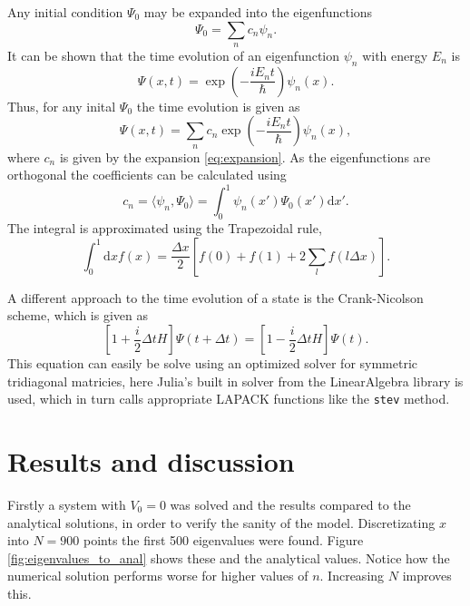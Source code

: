 \documentclass[a4paper, 11pt]{article}
\newcommand{\inner}[2]{\langle #1, #2 \rangle}
\begin{document}
Any initial condition $\Psi_0$ may be expanded into the eigenfunctions\cite{griffith}
\begin{equation}\label{eq:expansion}
\Psi_0 = \sum_n c_n \psi_n.
\end{equation}
It can be shown \cite{griffith} that the time evolution of an eigenfunction $\psi_n$ with energy $E_n$ is
\begin{equation}
\Psi(x, t) = \exp\left(-\frac{i E_n t}{\hbar} \right) \psi_n(x).
\end{equation}
Thus, for any inital $\Psi_0$ the time evolution is given as
\begin{equation}\label{eq:time_develop_expansion}
\Psi(x, t) = \sum_n c_n \exp\left(-\frac{i E_n t}{\hbar} \right) \psi_n(x),
\end{equation}
where $c_n$ is given by the expansion \eqref{eq:expansion}.
As the eigenfunctions are orthogonal\cite{griffith} the coefficients can be calculated using
\begin{equation}
c_n = \inner{\psi_n}{\Psi_0} = \int_0^1 \psi_n(x') \Psi_0(x') \mathrm{d}x'.
\end{equation}
The integral is approximated using the Trapezoidal rule,
\begin{equation}
\int_0^1 \mathrm{d}x f(x) = \frac{\Delta x}{2} \left[f(0) + f(1) + 2\sum_l f(l\Delta x)\right].
\end{equation}


A different approach to the time evolution of a state is the Crank-Nicolson scheme\cite{assignment}, which is given as
\begin{equation}\label{eq:crank_nicolson}
[1+\frac{i}{2} \Delta t H] \Psi(t + \Delta t) = [1 - \frac{i}{2} \Delta t H] \Psi(t).
\end{equation}
This equation can easily be solve using an optimized solver for symmetric tridiagonal matricies, here Julia's built in solver from the LinearAlgebra library is used, which in turn calls appropriate LAPACK functions like the \verb|stev| method.

\section{Results and discussion}
Firstly a system with $V_0=0$ was solved and the results compared to the analytical solutions, in order to verify the sanity of the model.
Discretizating $x$ into $N=900$ points the first 500 eigenvalues were found.
Figure \ref{fig:eigenvalues_to_anal} shows these and the analytical values.
Notice how the numerical solution performs worse for higher values of $n$.
Increasing $N$ improves this.
\end{document}
